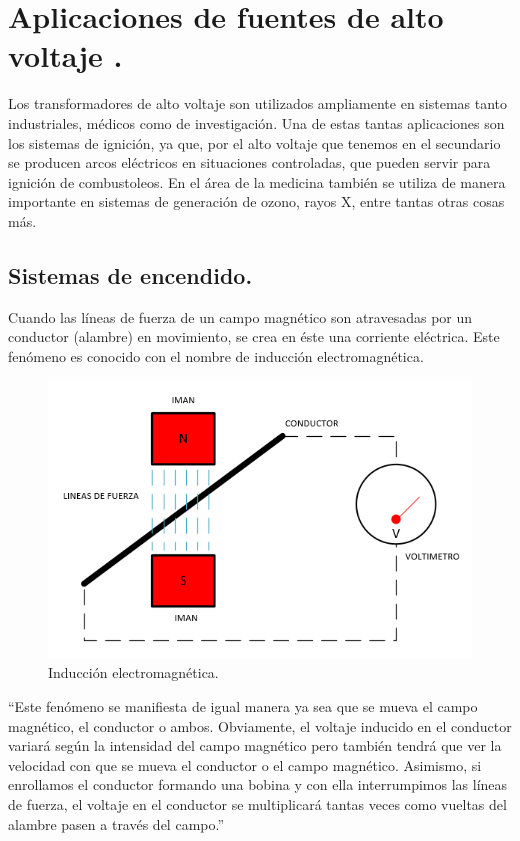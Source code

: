 \section{Aplicaciones de fuentes de alto voltaje .}

Los transformadores de alto voltaje son utilizados ampliamente en sistemas tanto industriales, médicos como de investigación. Una de estas tantas aplicaciones son los sistemas de ignición, ya que, por el alto voltaje que tenemos en el secundario se producen arcos eléctricos en situaciones controladas, que pueden servir para ignición de combustoleos. En el área de la medicina también se utiliza de manera importante en sistemas de generación de ozono, rayos X, entre tantas otras cosas más.  \\


\subsection{Sistemas de encendido.}

Cuando las líneas de fuerza de un campo magnético son
atravesadas por un conductor (alambre) en movimiento, se crea en éste
una corriente eléctrica. Este fenómeno es conocido con el nombre de
inducción electromagnética.\\

\begin{figure}[H]
\centering
\includegraphics[width=12cm]{capitulo3/figs/induc.png}
\caption{ Inducción electromagnética.}
\end{figure}

``Este fenómeno se manifiesta de igual manera ya sea que se
mueva el campo magnético, el conductor o ambos. Obviamente, el voltaje
inducido en el conductor variará según la intensidad del campo magnético
pero también tendrá que ver la velocidad con que se mueva el conductor o el campo magnético. Asimismo, si enrollamos el conductor formando una
bobina y con ella interrumpimos las líneas de fuerza, el voltaje en el
conductor se multiplicará tantas veces como vueltas del alambre pasen a
través del campo.''\\

